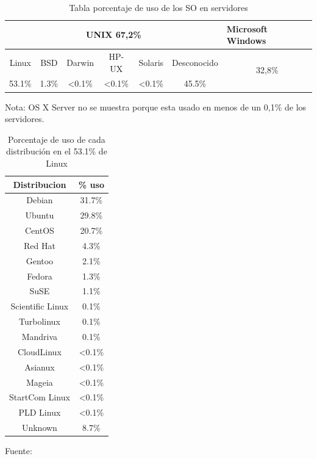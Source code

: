 \begin{table}[h]
\hskip -0.5cm
    \begin{tabular}{|c|c|c|c|c|c|c|}
        \hline
        \multicolumn{6}{|c|}{UNIX 67,2\%}                                                  & \multicolumn{1}{l|}{Microsoft Windows} \\ \hline
        Linux  & BSD   & Darwin          & HP-UX           & Solaris         & Desconocido & \multirow{2}{*}{32,8\%}                \\ \cline{1-6}
        53.1\% & 1.3\% & \textless 0.1\% & \textless 0.1\% & \textless 0.1\% & 45.5\%      &                                        \\ \hline
    \end{tabular}
    \label{Tabla3}
    \caption{Tabla porcentaje de uso de los SO en servidores }
    Nota: OS X Server no se muestra porque esta usado en menos de un 0,1\% de los servidores.\cite{serv1} \cite{serv2}
\end{table}


\begin{table}[h]
\centering
\begin{tabular}{|c|c|}
\hline
Distribucion     & \% uso          \\ \hline
Debian           & 31.7\%          \\ \hline
Ubuntu           & 29.8\%          \\ \hline
CentOS           & 20.7\%          \\ \hline
Red Hat          & 4.3\%           \\ \hline
Gentoo           & 2.1\%           \\ \hline
Fedora           & 1.3\%           \\ \hline
SuSE             & 1.1\%           \\ \hline
Scientific Linux & 0.1\%           \\ \hline
Turbolinux       & 0.1\%           \\ \hline
Mandriva         & 0.1\%           \\ \hline
CloudLinux       & \textless 0.1\% \\ \hline
Asianux          & \textless 0.1\% \\ \hline
Mageia           & \textless 0.1\% \\ \hline
StartCom Linux   & \textless 0.1\% \\ \hline
PLD Linux        & \textless 0.1\% \\ \hline
Unknown          & 8.7\%           \\ \hline
\end{tabular}
\caption{Porcentaje de uso de cada distribución en el 53.1\% de Linux  }
Fuente:\cite{serv3}
\label{Tabla4}
\end{table}

